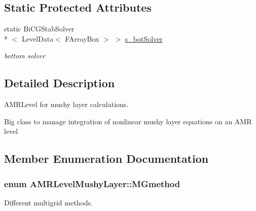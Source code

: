 \subsection*{Static Protected Attributes}
\begin{DoxyCompactItemize}
\item 
\hypertarget{class_a_m_r_level_mushy_layer_a8c401f05b4163845cc987f0d6baae9d0}{static Bi\-C\-G\-Stab\-Solver\\*
$<$ Level\-Data$<$ F\-Array\-Box $>$ $>$ \hyperlink{class_a_m_r_level_mushy_layer_a8c401f05b4163845cc987f0d6baae9d0}{s\-\_\-bot\-Solver}}\label{class_a_m_r_level_mushy_layer_a8c401f05b4163845cc987f0d6baae9d0}

\begin{DoxyCompactList}\small\item\em bottom solver \end{DoxyCompactList}\end{DoxyCompactItemize}


\subsection{Detailed Description}
A\-M\-R\-Level for mushy layer calculations. 

Big class to manage integration of nonlinear mushy layer equations on an A\-M\-R level 

\subsection{Member Enumeration Documentation}
\hypertarget{class_a_m_r_level_mushy_layer_ac96810ce869ac7ad58404b43a823cba3}{
\subsubsection[{M\-Gmethod}]{\setlength{\rightskip}{0pt plus 5cm}enum {\bf A\-M\-R\-Level\-Mushy\-Layer\-::\-M\-Gmethod}\hspace{0.3cm}{\ttfamily [protected]}}}\label{class_a_m_r_level_mushy_layer_ac96810ce869ac7ad58404b43a823cba3}


Different multigrid methods. 

